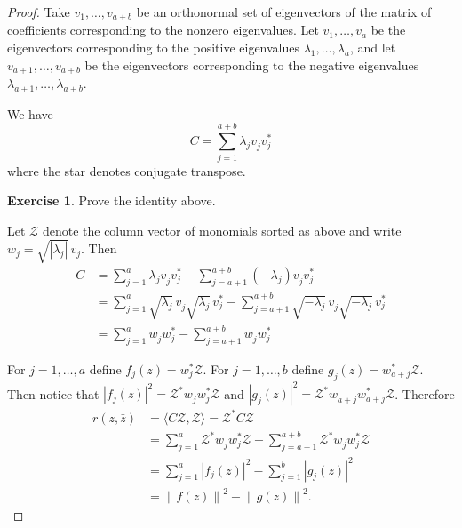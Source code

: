 \documentclass[12pt,openany]{book}
\newcommand{\abs}[1]{\left\lvert {#1} \right\rvert}
\newcommand{\norm}[1]{\left\lVert {#1} \right\rVert}
\newcommand{\sZ}{{\mathcal{Z}}}
\theoremstyle{plain}
\theoremstyle{remark}
\theoremstyle{definition}
\theoremstyle{exercise}
\newtheorem{exercise}{Exercise}[section]
\theoremstyle{example}
\begin{document}
\begin{proof}
Take $v_1,\ldots,v_{a+b}$ be an orthonormal set of eigenvectors of
the matrix of coefficients corresponding
to the nonzero eigenvalues.
Let $v_1,\ldots,v_a$ be the eigenvectors corresponding to
the positive eigenvalues $\lambda_1,\ldots,\lambda_a$,
and let $v_{a+1},\ldots,v_{a+b}$ be the eigenvectors corresponding to
the negative eigenvalues $\lambda_{a+1},\ldots,\lambda_{a+b}$.

We have
\begin{equation}
C = \sum_{j=1}^{a+b} \lambda_j v_j^{} v_j^* 
\end{equation}
where the star denotes conjugate transpose.

\begin{exercise}
Prove the identity above.
\end{exercise}

Let $\sZ$ denote the column vector of monomials sorted as above
and write $w_j = \sqrt{\abs{\lambda_j}}\, v_j$.
Then
\begin{equation}
\begin{split}
C & = \sum_{j=1}^a \lambda_j v_j^{} v_j^* - \sum_{j=a+1}^{a+b} (-\lambda_j) v_j^{} v_j^* 
\\
& = \sum_{j=1}^a \sqrt{\lambda_j}\, v_j^{} \sqrt{\lambda_j}\, v_j^*
- \sum_{j=a+1}^{a+b} \sqrt{-\lambda_j}\, v_j^{} \sqrt{-\lambda_j}\, v_j^* 
\\
& = \sum_{j=1}^a w_j^{} w_j^*
- \sum_{j=a+1}^{a+b} w_j^{} w_j^* 
\end{split}
\end{equation}

For $j=1,\ldots,a$ define $f_j(z) = w_j^* \sZ$.
For $j=1,\ldots,b$ define $g_j(z) = w_{a+j}^* \sZ$.
Then notice that $\abs{f_j(z)}^2 =
\sZ^* w_j^{} w_j^* \sZ$ and
$\abs{g_j(z)}^2 =
\sZ^* w_{a+j}^{} w_{a+j}^* \sZ$.  Therefore
\begin{equation}
\begin{split}
r(z,\bar{z}) &= \langle C \sZ , \sZ \rangle = \sZ^* C \sZ \\
& =
\sum_{j=1}^a \sZ^* w_j^{} w_j^* \sZ - \sum_{j=a+1}^{a+b} \sZ^* w_j^{} w_j^* \sZ
\\
& = 
\sum_{j=1}^a \abs{f_j(z)}^2 - \sum_{j=1}^{b} \abs{g_j(z)}^2 \\
& =
\norm{f(z)}^2 - \norm{g(z)}^2 .
\end{split}
\end{equation}
\end{proof}
\end{document}

